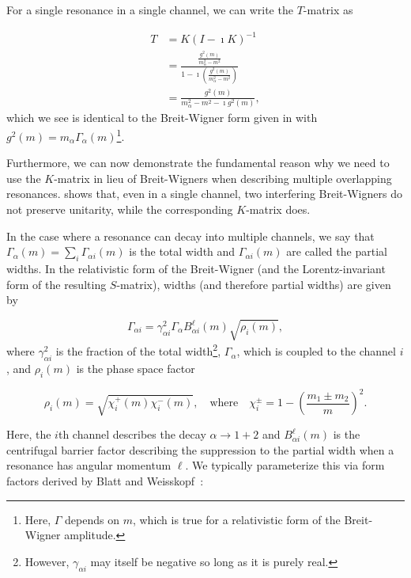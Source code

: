 For a single resonance in a single channel, we can write the $T$-matrix as

\begin{align}
  T &= K(I-\imath K)^{-1} \\
    &= \frac{\frac{g^2(m)}{m_\alpha^2 - m^2}}{1 - \imath \left(\frac{g^2(m)}{m_\alpha^2 - m^2}\right)} \\
    &= \frac{g^2(m)}{m_\alpha^2 - m^2 - \imath g^2(m)},
\end{align}
which we see is identical to the Breit-Wigner form given in  with $g^2(m) = m_\alpha\Gamma_\alpha(m)$\footnote{Here, $\Gamma$ depends on $m$, which is true for a relativistic form of the Breit-Wigner amplitude.}.

Furthermore, we can now demonstrate the fundamental reason why we need to use the $K$-matrix in lieu of Breit-Wigners when describing multiple overlapping resonances.  shows that, even in a single channel, two interfering Breit-Wigners do not preserve unitarity, while the corresponding $K$-matrix does.

In the case where a resonance can decay into multiple channels, we say that $\Gamma_\alpha(m) = \sum_i \Gamma_{\alpha i}(m)$ is the total width and $\Gamma_{\alpha i}(m)$ are called the partial widths. In the relativistic form of the Breit-Wigner (and the Lorentz-invariant form of the resulting $S$-matrix), widths (and therefore partial widths) are given by

\begin{equation}
  \Gamma_{\alpha i} = \gamma^2_{\alpha i} \Gamma_{\alpha} B^\ell_{\alpha i}(m) \sqrt{\rho_i(m)},
  \label{eq:partial-width}
\end{equation}
where $\gamma^2_{\alpha i}$ is the fraction of the total width\footnote{However, $\gamma_{\alpha i}$ may itself be negative so long as it is purely real.}, $\Gamma_\alpha$, which is coupled to the channel $i$, and $\rho_i(m)$ is the phase space factor

\begin{equation}
  \rho_i(m) = \sqrt{\chi^+_i(m)\chi^-_i(m)},\quad\text{where}\quad\chi^{\pm}_i = 1 - \left(\frac{m_1 \pm m_2}{m}\right)^2.
  \label{eq:rho}
\end{equation}

Here, the $i$th channel describes the decay $\alpha \to 1 + 2$ and $B^\ell_{\alpha i}(m)$ is the centrifugal barrier factor describing the suppression to the partial width when a resonance has angular momentum $\ell$. We typically parameterize this via form factors derived by Blatt and Weisskopf~\cite{Blatt1979}:

